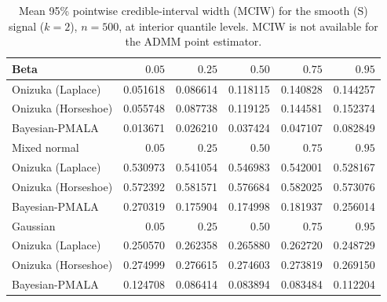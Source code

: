 \begin{table}[!htbp]
\centering
\small
\caption{Mean 95\% pointwise credible-interval width (MCIW) for the smooth (S) signal ($k=2$), $n=500$, at interior quantile levels. MCIW is not available for the ADMM point estimator.}
\label{tab:s_int_mciw}
\begin{tabular}{lrrrrr}
\toprule
Beta & $0.05$ & $0.25$ & $0.50$ & $0.75$ & $0.95$ \\
\midrule
Onizuka (Laplace) & 0.051618 & 0.086614 & 0.118115 & 0.140828 & 0.144257 \\
Onizuka (Horseshoe) & 0.055748 & 0.087738 & 0.119125 & 0.144581 & 0.152374 \\
Bayesian-PMALA & 0.013671 & 0.026210 & 0.037424 & 0.047107 & 0.082849 \\
\midrule
Mixed normal & $0.05$ & $0.25$ & $0.50$ & $0.75$ & $0.95$ \\
\midrule
Onizuka (Laplace) & 0.530973 & 0.541054 & 0.546983 & 0.542001 & 0.528167 \\
Onizuka (Horseshoe) & 0.572392 & 0.581571 & 0.576684 & 0.582025 & 0.573076 \\
Bayesian-PMALA & 0.270319 & 0.175904 & 0.174998 & 0.181937 & 0.256014 \\
\midrule
Gaussian & $0.05$ & $0.25$ & $0.50$ & $0.75$ & $0.95$ \\
\midrule
Onizuka (Laplace) & 0.250570 & 0.262358 & 0.265880 & 0.262720 & 0.248729 \\
Onizuka (Horseshoe) & 0.274999 & 0.276615 & 0.274603 & 0.273819 & 0.269150 \\
Bayesian-PMALA & 0.124708 & 0.086414 & 0.083894 & 0.083484 & 0.112204 \\
\bottomrule
\end{tabular}
\end{table}
